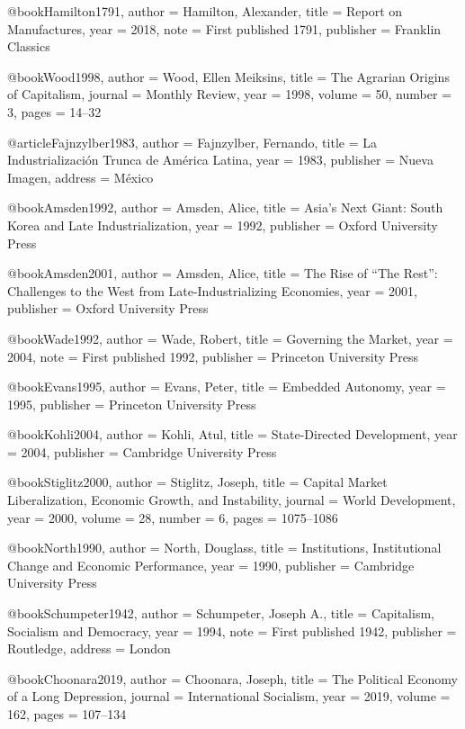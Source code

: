 @book{Hamilton1791,
	author    = {Hamilton, Alexander},
	title     = {Report on Manufactures},
	year      = {2018},
	note      = {First published 1791},
	publisher = {Franklin Classics}
}

@book{Wood1998,
	author  = {Wood, Ellen Meiksins},
	title   = {The Agrarian Origins of Capitalism},
	journal = {Monthly Review},
	year    = {1998},
	volume  = {50},
	number  = {3},
	pages   = {14--32}
}

@article{Fajnzylber1983,
	author    = {Fajnzylber, Fernando},
	title     = {La Industrializaci{\'o}n Trunca de {Am{\'e}rica Latina}},
	year      = {1983},
	publisher = {Nueva Imagen},
	address   = {M{\'e}xico}
}

@book{Amsden1992,
	author    = {Amsden, Alice},
	title     = {Asia's Next Giant: {South Korea} and Late Industrialization},
	year      = {1992},
	publisher = {Oxford University Press}
}

@book{Amsden2001,
	author    = {Amsden, Alice},
	title     = {The Rise of ``The Rest'': Challenges to the {West} from Late-Industrializing Economies},
	year      = {2001},
	publisher = {Oxford University Press}
}

@book{Wade1992,
	author    = {Wade, Robert},
	title     = {Governing the Market},
	year      = {2004},
	note      = {First published 1992},
	publisher = {Princeton University Press}
}

@book{Evans1995,
	author    = {Evans, Peter},
	title     = {Embedded Autonomy},
	year      = {1995},
	publisher = {Princeton University Press}
}

@book{Kohli2004,
	author    = {Kohli, Atul},
	title     = {State-Directed Development},
	year      = {2004},
	publisher = {Cambridge University Press}
}

@book{Stiglitz2000,
	author  = {Stiglitz, Joseph},
	title   = {Capital Market Liberalization, Economic Growth, and Instability},
	journal = {World Development},
	year    = {2000},
	volume  = {28},
	number  = {6},
	pages   = {1075--1086}
}

@book{North1990,
	author    = {North, Douglass},
	title     = {Institutions, Institutional Change and Economic Performance},
	year      = {1990},
	publisher = {Cambridge University Press}
}

@book{Schumpeter1942,
	author    = {Schumpeter, Joseph A.},
	title     = {Capitalism, Socialism and Democracy},
	year      = {1994},
	note      = {First published 1942},
	publisher = {Routledge},
	address   = {London}
}

@book{Choonara2019,
	author  = {Choonara, Joseph},
	title   = {The Political Economy of a Long Depression},
	journal = {International Socialism},
	year    = {2019},
	volume  = {162},
	pages   = {107--134}
}

